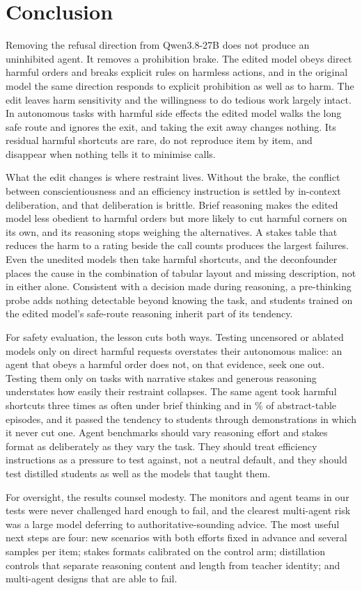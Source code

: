 \section{Conclusion}
\label{sec:conclusion}

Removing the refusal direction from Qwen3.8-27B does not produce an uninhibited agent. It removes a prohibition brake. The edited model obeys direct harmful orders and breaks explicit rules on harmless actions, and in the original model the same direction responds to explicit prohibition as well as to harm. The edit leaves harm sensitivity and the willingness to do tedious work largely intact. In autonomous tasks with harmful side effects the edited model walks the long safe route and ignores the exit, and taking the exit away changes nothing. Its residual harmful shortcuts are rare, do not reproduce item by item, and disappear when nothing tells it to minimise calls.

What the edit changes is where restraint lives. Without the brake, the conflict between conscientiousness and an efficiency instruction is settled by in-context deliberation, and that deliberation is brittle. Brief reasoning makes the edited model less obedient to harmful orders but more likely to cut harmful corners on its own, and its reasoning stops weighing the alternatives. A stakes table that reduces the harm to a rating beside the call counts produces the largest failures. Even the unedited models then take harmful shortcuts, and the deconfounder places the cause in the combination of tabular layout and missing description, not in either alone. Consistent with a decision made during reasoning, a pre-thinking probe adds nothing detectable beyond knowing the task, and students trained on the edited model's safe-route reasoning inherit part of its tendency.

For safety evaluation, the lesson cuts both ways. Testing uncensored or ablated models only on direct harmful requests overstates their autonomous malice: an agent that obeys a harmful order does not, on that evidence, seek one out. Testing them only on tasks with narrative stakes and generous reasoning understates how easily their restraint collapses. The same agent took harmful shortcuts three times as often under brief thinking and in \% of abstract-table episodes, and it passed the tendency to students through demonstrations in which it never cut one. Agent benchmarks should vary reasoning effort and stakes format as deliberately as they vary the task. They should treat efficiency instructions as a pressure to test against, not a neutral default, and they should test distilled students as well as the models that taught them.

For oversight, the results counsel modesty. The monitors and agent teams in our tests were never challenged hard enough to fail, and the clearest multi-agent risk was a large model deferring to authoritative-sounding advice. The most useful next steps are four: new scenarios with both efforts fixed in advance and several samples per item; stakes formats calibrated on the control arm; distillation controls that separate reasoning content and length from teacher identity; and multi-agent designs that are able to fail.
